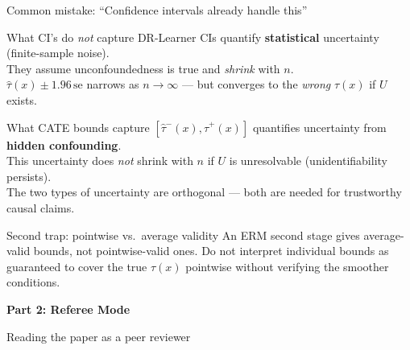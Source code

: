 \documentclass[aspectratio=169]{beamer}
\begin{document}
\begin{frame}{Common mistake: ``Confidence intervals already handle this''}

\begin{alertblock}{What CI's do \emph{not} capture}
DR-Learner CIs quantify \textbf{statistical} uncertainty (finite-sample noise).\\
They assume unconfoundedness is true and \emph{shrink} with $n$.\\[4pt]
$\hat\tau(x) \pm 1.96\,\mathrm{se}$ narrows as $n\to\infty$ --- but converges to the \emph{wrong} $\tau(x)$ if $U$ exists.
\end{alertblock}

\smallskip
\begin{block}{What CATE bounds capture}
$[\hat\tau^-(x), \hat\tau^+(x)]$ quantifies uncertainty from \textbf{hidden confounding}.\\
This uncertainty does \emph{not} shrink with $n$ if $U$ is unresolvable (unidentifiability persists).\\
The two types of uncertainty are orthogonal --- both are needed for trustworthy causal claims.
\end{block}

\smallskip
\begin{alertblock}{Second trap: pointwise vs.\ average validity}
An ERM second stage gives average-valid bounds, not pointwise-valid ones. Do not interpret individual bounds as guaranteed to cover the true $\tau(x)$ pointwise without verifying the smoother conditions.
\end{alertblock}
\end{frame}


\begin{frame}{}
\begin{center}
\vspace{1em}
{\Large \textbf{Part 2: Referee Mode}}

\vspace{1em}
{\large Reading the paper as a peer reviewer}
\end{center}
\end{frame}

\end{document}
